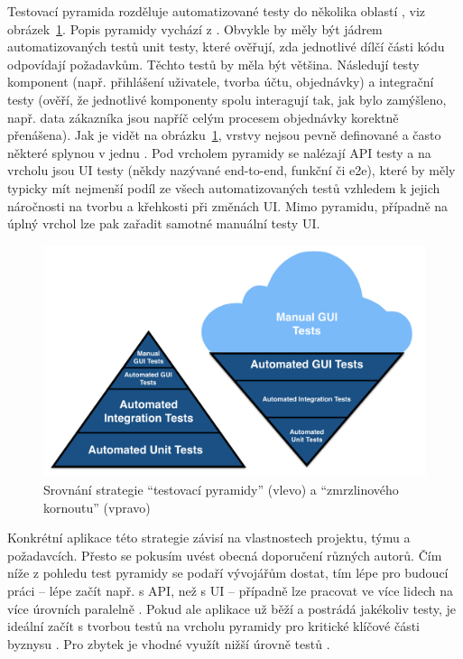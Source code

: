 Testovací pyramida rozděluje automatizované testy do několika oblastí \cite{test-smartbear}, viz obrázek~\ref{fig:testing_pyramid}. Popis pyramidy vychází z \cite{test-kitner2, test-smartbear}. Obvykle by měly být jádrem automatizovaných testů unit testy, které ověřují, zda jednotlivé dílčí části kódu odpovídají požadavkům. Těchto testů by měla být většina. Následují testy komponent (např. přihlášení uživatele, tvorba účtu, objednávky) a integrační testy (ověří, že jednotlivé komponenty spolu interagují tak, jak bylo zamýšleno, např. data zákazníka jsou napříč celým procesem objednávky korektně přenášena). Jak je vidět na obrázku~\ref{fig:testing_pyramid}, vrstvy nejsou pevně definované a často některé splynou v jednu \cite{test-fowler}. Pod vrcholem pyramidy se nalézají API testy a na vrcholu jsou UI testy (někdy nazývané end-to-end, funkční či e2e), které by měly typicky mít nejmenší podíl ze všech automatizovaných testů vzhledem k jejich náročnosti na tvorbu a křehkosti při změnách UI. Mimo pyramidu, případně na úplný vrchol lze pak zařadit samotné manuální testy UI.

\begin{figure}[ht]\centering
	\includegraphics[width=1\textwidth]{img/ext/testing_pyramid.png}
	\caption[Srovnání strategie \enquote{testovací pyramidy} a \enquote{zmrzlinového kornoutu}]{Srovnání strategie \enquote{testovací pyramidy} (vlevo) a \enquote{zmrzlinového kornoutu} (vpravo) \cite{test-fishman}}\label{fig:testing_pyramid}
\end{figure}

Konkrétní aplikace této strategie závisí na vlastnostech projektu, týmu a požadavcích. Přesto se pokusím uvést obecná doporučení různých autorů. Čím níže z pohledu test pyramidy se podaří vývojářům dostat, tím lépe pro budoucí práci -- lépe začít např. s API, než s UI -- případně lze pracovat ve více lidech na více úrovních paralelně \cite{test-kitner}. Pokud ale aplikace už běží a postrádá jakékoliv testy, je ideální začít s tvorbou testů na vrcholu pyramidy pro kritické klíčové části byznysu \cite{test-atlassian}. Pro zbytek je vhodné využít nižší úrovně testů \cite{test-atlassian2}.

